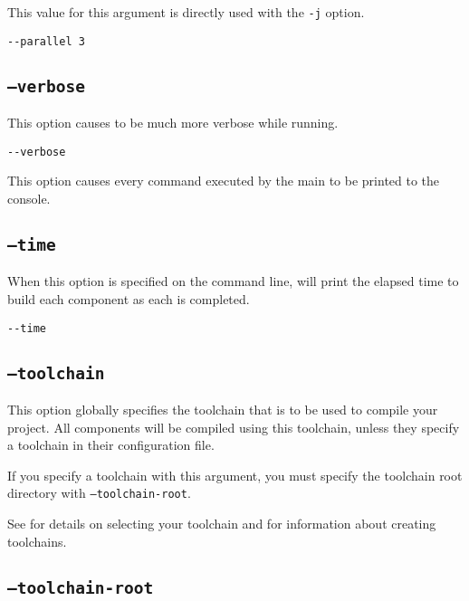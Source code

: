 This value for this argument is directly used with the \gnumake
\texttt{-j} option.

\begin{verbatim}
--parallel 3
\end{verbatim}

\subsection{\texttt{--verbose}}

This option causes \lmsbw to be much more verbose while running.

\begin{verbatim}
--verbose
\end{verbatim}

This option causes every command executed by the main \makefile to be
printed to the console.

\subsection{\texttt{--time}}

When this option is specified on the command line, \lmsbw will print
the elapsed time to build each component as each is completed.

\begin{verbatim}
--time
\end{verbatim}

\subsection{\texttt{--toolchain}}\label{usinglmsbw:toolchain}

This option globally specifies the toolchain that is to be used to
compile your project.  All components will be compiled using this
toolchain, unless they specify a toolchain in their configuration
file.

If you specify a toolchain with this argument, you must specify the
toolchain root directory with \texttt{--toolchain-root}.

See  for details on selecting your
toolchain and  for information
about creating toolchains.

\subsection{\texttt{--toolchain-root}}\label{usinglmsbw:toolchain-root}

